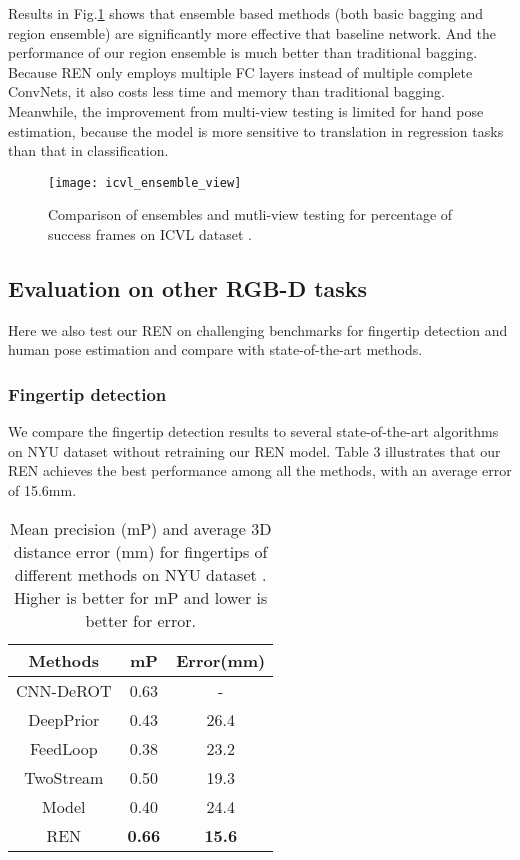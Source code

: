 \documentclass[10pt,twocolumn,letterpaper]{article}
\begin{document}
Results in Fig.\ref{fig_ensemble} shows that ensemble based methods (both basic bagging and region ensemble) are significantly more effective that baseline network. And the performance of our region ensemble is much better than traditional bagging. Because REN only employs multiple FC layers instead of multiple complete ConvNets, it also costs less time and memory than traditional bagging. Meanwhile, the improvement from multi-view testing is limited for hand pose estimation, because the model is more sensitive to translation in regression tasks than that in classification.

\begin{figure}[htb]
\centering
{\texttt{[image: icvl\_ensemble\_view]}}
\caption{Comparison of ensembles and mutli-view testing for percentage of success frames on ICVL dataset \cite{tang2014latent}. }
\label{fig_ensemble}
\end{figure}


\subsection{Evaluation on other RGB-D tasks}
Here we also test our REN on challenging benchmarks for fingertip detection and human pose estimation and compare with state-of-the-art methods.
\subsubsection{Fingertip detection}
We compare the fingertip detection results to several state-of-the-art algorithms \cite{wetzler2015rule} \cite{guo2016two} on NYU dataset without retraining our REN model. Table 3 illustrates that our REN achieves the best performance among all the methods, with an average error of 15.6mm.

\begin{table}[htb]
\label{table_finger}
\caption{Mean precision (mP) and average 3D distance error (mm) for fingertips of different methods on NYU dataset \cite{tompson2014real}. Higher is better for mP and lower is better for error.}
\centering
\begin{tabular}{|c|c|c|}
\hline
Methods & mP & Error(mm) \\
\hline
CNN-DeROT \cite{wetzler2015rule} & 0.63 & - \\
DeepPrior \cite{oberweger2015hands} & 0.43 & 26.4 \\
FeedLoop \cite{oberwegertraining} & 0.38 & 23.2 \\
TwoStream \cite{guo2016two} & 0.50 & 19.3 \\
Model \cite{zhou2016model} & 0.40 & 24.4 \\
REN & \textbf{0.66} & \textbf{15.6} \\
\hline
\end{tabular}
\end{table}
\end{document}
